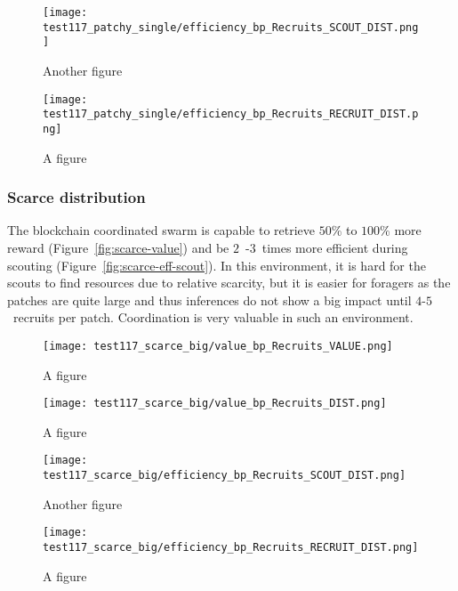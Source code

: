 \documentclass[runningheads]{llncs}
\begin{document}
\begin{figure}
\centering
\begin{minipage}{.495\textwidth}
  \centering
  \texttt{[image: test117\_patchy\_single/efficiency\_bp\_Recruits\_SCOUT\_DIST.png]}
  \caption{Another figure}
  \label{fig:hotspot-eff-exp}
\end{minipage}
\begin{minipage}{.495\textwidth}
  \centering
  \texttt{[image: test117\_patchy\_single/efficiency\_bp\_Recruits\_RECRUIT\_DIST.png]}
  \caption{A figure}
  \label{fig:hotspot-eff-for}
\end{minipage}
\end{figure}


\subsubsection{Scarce distribution}

The blockchain coordinated swarm is capable to retrieve $50$\% to $100$\% more reward (Figure~\ref{fig:scarce-value}) and be $2$~-$3$~times more efficient during scouting (Figure~\ref{fig:scarce-eff-scout}). In this environment, it is hard for the scouts to find resources due to relative scarcity, but it is easier for foragers as the patches are quite large and thus inferences do not show a big impact until $4$-$5$~recruits per patch. Coordination is very valuable in such an environment.

\begin{figure}
\centering
\begin{minipage}{.495\textwidth}
  \centering
  \texttt{[image: test117\_scarce\_big/value\_bp\_Recruits\_VALUE.png]}
  \caption{A figure}
  \label{fig:scarce-value}
\end{minipage}
\begin{minipage}{.495\textwidth}
  \centering
  \texttt{[image: test117\_scarce\_big/value\_bp\_Recruits\_DIST.png]}
  \caption{A figure}
  \label{fig:scarce-dist}
\end{minipage}
\end{figure}

\begin{figure}
\centering
\begin{minipage}{.495\textwidth}
  \centering
  \texttt{[image: test117\_scarce\_big/efficiency\_bp\_Recruits\_SCOUT\_DIST.png]}
  \caption{Another figure}
  \label{fig:scarce-eff-scout}
\end{minipage}
\begin{minipage}{.495\textwidth}
  \centering
  \texttt{[image: test117\_scarce\_big/efficiency\_bp\_Recruits\_RECRUIT\_DIST.png]}
  \caption{A figure}
  \label{fig:scarce-eff-recruit}
\end{minipage}
\end{figure}
\end{document}
